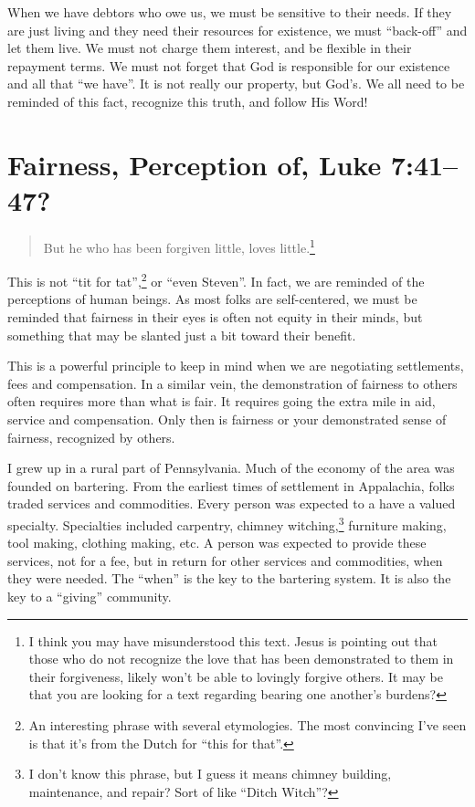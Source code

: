 \documentclass[12pt]{memoir}
\begin{document}
When we have debtors who owe us, we must be sensitive to their needs.
If they are just living and they need their resources for existence,
we must ``back-off'' and let them live. We must not charge them
interest, and be flexible in their repayment terms. We must not forget
that God is responsible for our existence and all that ``we have''.
It is not really our property, but God's. We all need to be reminded
of this fact, recognize this truth, and follow His Word!

\section[\textquestiondown{}Fairness, Perception of?]{\textquestiondown{}Fairness, Perception of, Luke 7:41--47?}

\begin{quote}
But he who has been forgiven little, loves little.\footnote{I think you may have misunderstood this text. Jesus is pointing out that those who do not recognize the love that has been demonstrated to them in their forgiveness, likely won't be able to lovingly forgive others. It may be that you are looking for a text regarding bearing one another's burdens?}
\end{quote}

This is not ``tit for tat'',\footnote{An interesting phrase with several etymologies. The most convincing I've seen is that it's from the Dutch for ``this for that''.} or ``even Steven''. In fact, we are reminded of the perceptions of human beings. As most folks are self-centered, we must be reminded that fairness in their eyes is often not equity in their minds, but something that may be slanted just a bit toward their benefit.

This is a powerful principle to keep in mind when we are negotiating settlements, fees and compensation. In a similar vein, the demonstration of fairness to others often requires more than what is fair. It requires going the extra mile in aid, service and compensation. Only then is fairness or your demonstrated sense of fairness, recognized by others.

I grew up in a rural part of Pennsylvania. Much of the economy of
the area was founded on bartering. From the earliest times of settlement in Appalachia, folks traded services and commodities. Every
person was expected to a have a valued specialty. Specialties
included carpentry, chimney witching,\footnote{I don't know this phrase, but I guess it means chimney building, maintenance, and repair? Sort of like ``Ditch Witch''?} furniture making, tool making,
clothing making, etc. A person was expected to provide these services,
not for a fee, but in return for other services and commodities, when
they were needed. The ``when'' is the key to the bartering system. It is also the key to a ``giving'' community. 
\end{document}
